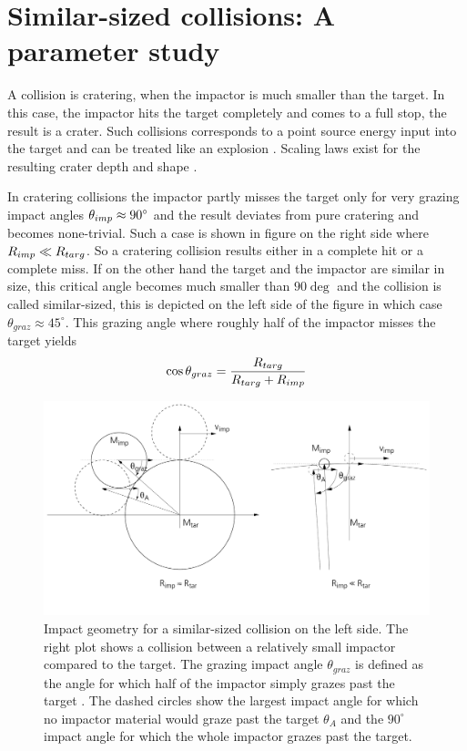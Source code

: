\newpage
\chapter{Similar-sized collisions: A parameter study}
\graphicspath{{./03figs/}}

A collision is cratering, when the impactor is much smaller than the target. In this case, the impactor hits the target completely and comes to a full stop, the result is a crater. Such collisions corresponds to a point source energy input into the target and can be treated like an explosion \citep{Melosh:2007p3502}. Scaling laws exist for the resulting crater depth and shape \citep{Holsapple:1993p3018}. 

In cratering collisions the impactor partly misses the target only for very grazing impact angles $\theta_{imp} \approx 90 ^\circ$ and the result deviates from pure cratering and becomes none-trivial. Such a case is shown in figure \label{ch03_fig03} on the right side where $R_{imp} \ll R_{targ}$. So a cratering collision results either in a complete hit or a complete miss. If on the other hand the target and the impactor are similar in size, this critical angle becomes much smaller than $90 \deg$ and the collision is called similar-sized, this is depicted on the left side of the figure in which case $\theta_{graz} \approx 45^\circ$. This grazing angle where roughly half of the impactor misses the target yields
\begin{equation}
\label{ch03_eq001}
\cos{ \theta_{graz} }= \frac{R_{targ}}{R_{targ} + R_{imp}}
\end{equation}

\begin{figure}
\begin{center}
\includegraphics[scale=0.4]{03_grazing}
\caption{Impact geometry for a similar-sized collision on the left side. The right plot shows a collision between a relatively small impactor compared to the target. The grazing impact angle $\theta_{graz}$ is defined as the angle for which half of the impactor simply grazes past the target \citep{Asphaug:2010p3539}. The dashed circles show the largest impact angle for which no impactor material would graze past the target $\theta_A$ and the $90^\circ$ impact angle for which the whole impactor grazes past the target.}
\label{ch03_fig03}
\end{center}
\end{figure}

